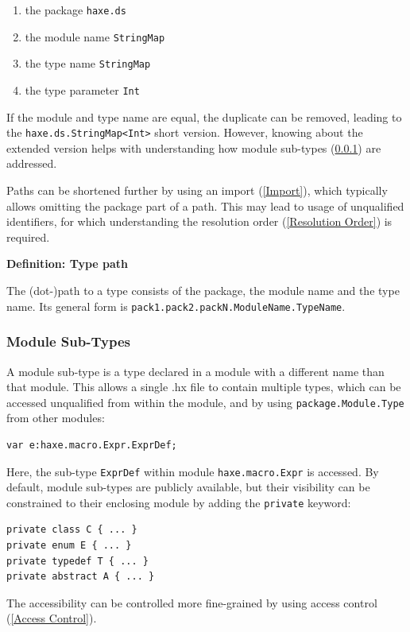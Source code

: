 \documentclass{article}
\newcommand{\type}[1]{\texttt{#1}}
\newcommand{\expr}[1]{\texttt{#1}}
\newenvironment{myshaded}
  {\def\FrameCommand{\fboxsep=\topsep\colorbox{bgcolor}}%
  \MakeFramed {\advance\hsize-\width \FrameRestore}}%
 {\endMakeFramed}
\newcommand{\define}[3][Definition]
	{\begin{myshaded}\noindent\textbf{#1: #2}\par\nobreak\noindent\ignorespaces#3\label{def:#2}\end{myshaded}}
\newcommand{\tref}[2]{#1 (\ref{#2})}
\begin{document}
\begin{enumerate}
	\item the package \expr{haxe.ds}
	\item the module name \expr{StringMap}
	\item the type name \type{StringMap}
	\item the type parameter \type{Int}
\end{enumerate}
If the module and type name are equal, the duplicate can be removed, leading to the \expr{haxe.ds.StringMap<Int>} short version. However, knowing about the extended version helps with understanding how \tref{module sub-types}{Module Sub-Types} are addressed.

Paths can be shortened further by using an \tref{import}{Import}, which typically allows omitting the package part of a path. This may lead to usage of unqualified identifiers, for which understanding the \tref{resolution order}{Resolution Order} is required.

\define{Type path}{The (dot-)path to a type consists of the package, the module name and the type name. Its general form is \expr{pack1.pack2.packN.ModuleName.TypeName}.} 


\subsubsection{Module Sub-Types}
\label{Module Sub-Types}

A module sub-type is a type declared in a module with a different name than that module. This allows a single .hx file to contain multiple types, which can be accessed unqualified from within the module, and by using \expr{package.Module.Type} from other modules:

\begin{lstlisting}
var e:haxe.macro.Expr.ExprDef;
\end{lstlisting}
Here, the sub-type \type{ExprDef} within module \expr{haxe.macro.Expr} is accessed. By default, module sub-types are publicly available, but their visibility can be constrained to their enclosing module by adding the \expr{private} keyword:

\begin{lstlisting}
private class C { ... }
private enum E { ... }
private typedef T { ... }
private abstract A { ... }
\end{lstlisting}
The accessibility can be controlled more fine-grained by using \tref{access control}{Access Control}.
\end{document}
